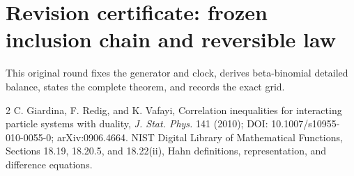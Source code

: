 \documentclass[10pt]{article}
\begin{document}
\ifnum{}
\section*{Revision certificate: frozen inclusion chain and reversible law}
This original round fixes the generator and clock, derives beta-binomial
detailed balance, states the complete theorem, and records the exact grid.
\fi

\begin{thebibliography}{2}
 C. Giardina, F. Redig, and K. Vafayi, Correlation inequalities
for interacting particle systems with duality, \emph{J. Stat. Phys.} 141
(2010); DOI: 10.1007/s10955-010-0055-0; arXiv:0906.4664.
 NIST Digital Library of Mathematical Functions, Sections
18.19, 18.20.5, and 18.22(ii), Hahn definitions, representation, and
difference equations.
\end{thebibliography}
\end{document}
